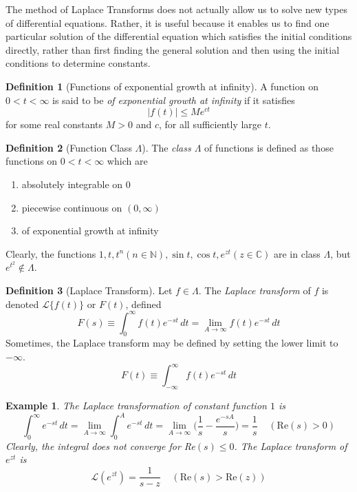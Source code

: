 \documentclass{article}
\newtheorem{example}{Example}[section]
\theoremstyle{remark}
\theoremstyle{definition}
\newtheorem{definition}{Definition}[section]
\begin{document}
The method of Laplace Transforms does not actually allow us to solve new types of differential equations. Rather, it is useful because it enables us to find one particular solution of the differential equation which satisfies the initial conditions directly, rather than first finding the general solution and then using the initial conditions to determine constants. 

\begin{definition}[Functions of exponential growth at infinity]
A function on $0 < t < \infty$ is said to be \textit{of exponential growth at infinity} if it satisfies
\[|f(t)| \leq M e^{ct}\]
for some real constants $M>0$ and $c$, for all sufficiently large $t$. 
\end{definition}

\begin{definition}[Function Class $\Lambda$]
The \textit{class $\Lambda$} of functions is defined as those functions on $0<t<\infty$ which are
\begin{enumerate}
    \item absolutely integrable on $0$ 
    \item piecewise continuous on $(0, \infty)$
    \item of exponential growth at infinity
\end{enumerate}
Clearly, the functions $1, t, t^n (n \in \mathbb{N}), \sin{t}, \cos{t}, e^{zt} (z \in \mathbb{C})$ are in class $\Lambda$, but $e^{t^2} \not\in \Lambda$. 
\end{definition}

\begin{definition}[Laplace Transform]
Let $f \in \Lambda$. The \textit{Laplace transform} of $f$ is denoted $\mathcal{L}\{f(t)\}$ or $F(t)$, defined
\[F(s) \equiv \int_0^\infty f(t)e^{-s t} \, dt = \lim_{A \rightarrow \infty} f(t) e^{-st}\,dt \]
Sometimes, the Laplace transform may be defined by setting the lower limit to $- \infty$. 
\[F(t) \equiv \int_{-\infty}^\infty f(t) e^{-s t}\,dt\]
\end{definition}

\begin{example}
The Laplace transformation of constant function $1$ is 
\[\int_0^\infty e^{-st}\,dt = \lim_{A \rightarrow \infty} \int_0^A e^{-st} \,dt = \lim_{A \rightarrow \infty} \bigg( \frac{1}{s} - \frac{e^{-sA}}{s} \bigg) = \frac{1}{s}\;\;\;\; (\text{Re}(s) > 0)\]
Clearly, the integral does not converge for Re$(s) \leq 0$. The Laplace transform of $e^{zt}$ is
\[\mathcal{L} (e^{zt}) = \frac{1}{s-z} \;\;\;\; (\text{Re}(s)> \text{Re}(z))\]
\end{example}
\end{document}
